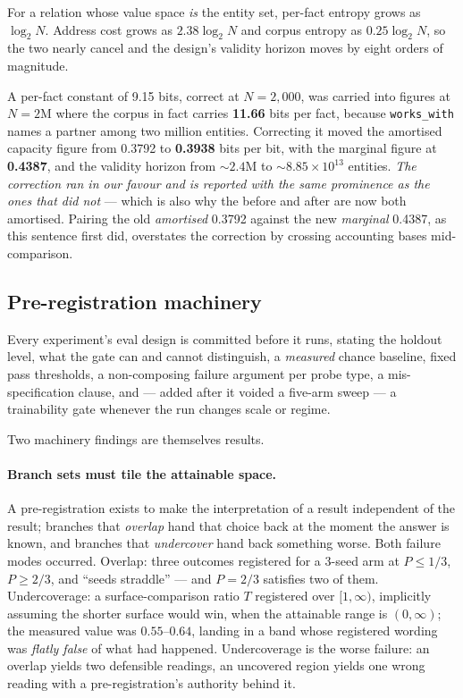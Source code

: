 \begin{proposition}
\label{prop:entropy}
For a relation whose value space \emph{is} the entity set, per-fact entropy grows as $\log_2 N$.
Address cost grows as $2.38 \log_2 N$ and corpus entropy as $0.25 \log_2 N$, so the two nearly
cancel and the design's validity horizon moves by eight orders of magnitude.
\end{proposition}

\noindent A per-fact constant of 9.15 bits, correct at $N = 2{,}000$, was carried into figures at
$N = 2$M where the corpus in fact carries \textbf{11.66} bits per fact, because \texttt{works\_with}
names a partner among two million entities.
Correcting it moved the amortised capacity figure from 0.3792 to \textbf{0.3938} bits per bit, with
the marginal figure at \textbf{0.4387}, and the validity horizon from ${\sim}2.4$M to
${\sim}8.85 \times 10^{13}$ entities.
\emph{The correction ran in our favour and is reported with the same prominence as the ones that did
not} --- which is also why the before and after are now both amortised. Pairing the old
\emph{amortised} 0.3792 against the new \emph{marginal} 0.4387, as this sentence first did,
overstates the correction by crossing accounting bases mid-comparison.

\subsection{Pre-registration machinery}

Every experiment's eval design is committed before it runs, stating the holdout level, what the gate
can and cannot distinguish, a \emph{measured} chance baseline, fixed pass thresholds, a
non-composing failure argument per probe type, a mis-specification clause, and --- added after it
voided a five-arm sweep --- a trainability gate whenever the run changes scale or regime.

Two machinery findings are themselves results.

\paragraph{Branch sets must tile the attainable space.} A pre-registration exists to make the
interpretation of a result independent of the result; branches that \emph{overlap} hand that choice
back at the moment the answer is known, and branches that \emph{undercover} hand back something
worse. Both failure modes occurred. Overlap: three outcomes registered for a 3-seed arm at
$P \le 1/3$, $P \ge 2/3$, and ``seeds straddle'' --- and $P = 2/3$ satisfies two of them.
Undercoverage: a surface-comparison ratio $T$ registered over $[1, \infty)$, implicitly assuming the
shorter surface would win, when the attainable range is $(0, \infty)$; the measured value was
$0.55$--$0.64$, landing in a band whose registered wording was \emph{flatly false} of what had
happened.
Undercoverage is the worse failure: an overlap yields two defensible readings, an uncovered region
yields one wrong reading with a pre-registration's authority behind it.

